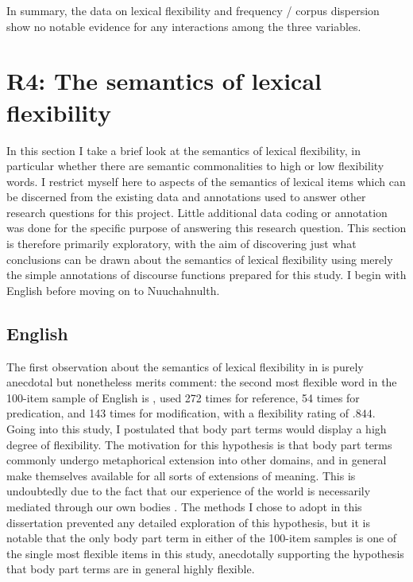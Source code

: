 In summary, the data on lexical flexibility and frequency / corpus dispersion show no notable evidence for any interactions among the three variables.

\section{R4: The semantics of lexical flexibility}
\label{sec:4.6}

In this section I take a brief look at the semantics of lexical flexibility, in particular whether there are semantic commonalities to high or low flexibility words. I restrict myself here to aspects of the semantics of lexical items which can be discerned from the existing data and annotations used to answer other research questions for this project. Little additional data coding or annotation was done for the specific purpose of answering this research question. This section is therefore primarily exploratory, with the aim of discovering just what conclusions can be drawn about the semantics of lexical flexibility using merely the simple annotations of discourse functions prepared for this study. I begin with English before moving on to Nuuchahnulth.

\subsection{English}
\label{sec:4.6.1}

The first observation about the semantics of lexical flexibility in  is purely anecdotal but nonetheless merits comment: the second most flexible word in the 100-item sample of English is , used 272 times for reference, 54 times for predication, and 143 times for modification, with a flexibility rating of $.844$. Going into this study, I postulated that body part terms would display a high degree of flexibility. The motivation for this hypothesis is that body part terms commonly undergo metaphorical extension into other domains, and in general make themselves available for all sorts of extensions of meaning. This is undoubtedly due to the fact that our experience of the world is necessarily mediated through our own bodies \parencite{LakoffJohnson1980}. The methods I chose to adopt in this dissertation prevented any detailed exploration of this hypothesis, but it is notable that the only body part term in either of the 100-item samples is one of the single most flexible items in this study, anecdotally supporting the hypothesis that body part terms are in general highly flexible.

